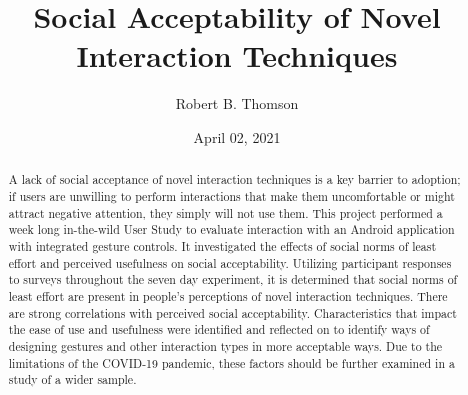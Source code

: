 \documentclass{l4proj}
\begin{document}
\title{Social Acceptability of Novel Interaction Techniques}
\author{Robert B. Thomson}
\date{April 02, 2021}

\maketitle

\begin{abstract}
    A lack of social acceptance of novel interaction techniques is a key barrier to adoption; if users are unwilling to perform interactions that make them uncomfortable or might attract negative attention, they simply will not use them. This project performed a week long in-the-wild User Study to evaluate interaction with an Android application with integrated gesture controls. It investigated the effects of social norms of least effort and perceived usefulness on social acceptability. Utilizing participant responses to surveys throughout the seven day experiment, it is determined that social norms of least effort are present in people's perceptions of novel interaction techniques. There are strong correlations with perceived social acceptability. Characteristics that impact the ease of use and usefulness were identified and reflected on to identify ways of designing gestures and other interaction types in more acceptable ways. Due to the limitations of the COVID-19 pandemic, these factors should be further examined in a study of a wider sample.
\end{abstract}


%
%
\def\consentname {Robert Borland Thomson} %
\def\consentdate {02 April 2021} %
%
\educationalconsent
\end{document}
